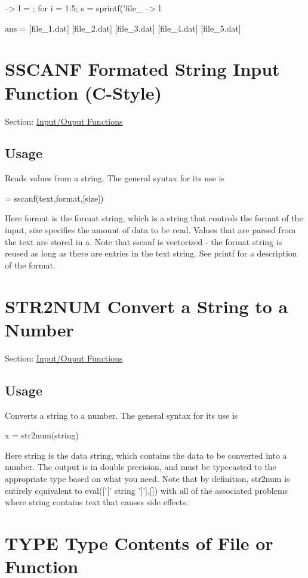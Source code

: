 \begin{DoxyVerbInclude}
--> l = {}; for i = 1:5; s = sprintf('file_%
--> l

ans = 
 [file_1.dat] [file_2.dat] [file_3.dat] [file_4.dat] [file_5.dat] 
\end{DoxyVerbInclude}
 \hypertarget{io_sscanf}{}\section{S\-S\-C\-A\-N\-F Formated String Input Function (C-\/\-Style)}\label{io_sscanf}
Section\-: \hyperlink{sec_io}{Input/\-Ouput Functions} \hypertarget{vtkwidgets_vtkxyplotwidget_Usage}{}\subsection{Usage}\label{vtkwidgets_vtkxyplotwidget_Usage}
Reads values from a string. The general syntax for its use is \begin{DoxyVerb}   = sscanf(text,format,[size])
\end{DoxyVerb}
 Here {\ttfamily format} is the format string, which is a string that controls the format of the input, {\ttfamily size} specifies the amount of data to be read. Values that are parsed from the {\ttfamily text} are stored in a. Note that sscanf is vectorized -\/ the format string is reused as long as there are entries in the {\ttfamily text} string. See {\ttfamily printf} for a description of the format. \hypertarget{io_str2num}{}\section{S\-T\-R2\-N\-U\-M Convert a String to a Number}\label{io_str2num}
Section\-: \hyperlink{sec_io}{Input/\-Ouput Functions} \hypertarget{vtkwidgets_vtkxyplotwidget_Usage}{}\subsection{Usage}\label{vtkwidgets_vtkxyplotwidget_Usage}
Converts a string to a number. The general syntax for its use is \begin{DoxyVerb}  x = str2num(string)
\end{DoxyVerb}
 Here {\ttfamily string} is the data string, which contains the data to be converted into a number. The output is in double precision, and must be typecasted to the appropriate type based on what you need. Note that by definition, {\ttfamily str2num} is entirely equivalent to {\ttfamily eval(\mbox{[}'\mbox{[}' string '\mbox{]}'\mbox{]},\mbox{[}\mbox{]})} with all of the associated problems where {\ttfamily string} contains text that causes side effects. \hypertarget{io_type}{}\section{T\-Y\-P\-E Type Contents of File or Function}\label{io_type}
